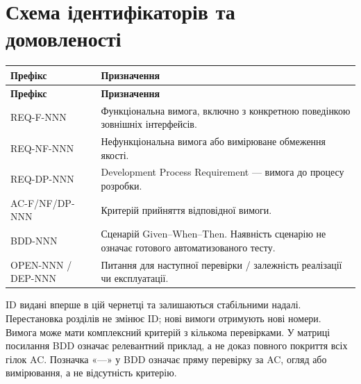 \documentclass[11pt,a4paper]{article}
\begin{document}
\section{Схема ідентифікаторів та домовленості}
\begin{longtable}{>{\raggedright\arraybackslash}p{4.4cm} >{\raggedright\arraybackslash}p{11.2cm}}
\toprule
\textbf{Префікс} & \textbf{Призначення} \\ \midrule
\endfirsthead
\toprule
\textbf{Префікс} & \textbf{Призначення} \\ \midrule
\endhead
\bottomrule
\endfoot
REQ-F-NNN & Функціональна вимога, включно з конкретною поведінкою зовнішніх інтерфейсів. \\
REQ-NF-NNN & Нефункціональна вимога або вимірюване обмеження якості. \\
REQ-DP-NNN & Development Process Requirement — вимога до процесу розробки. \\
AC-F/NF/DP-NNN & Критерій прийняття відповідної вимоги. \\
BDD-NNN & Сценарій Given–When–Then. Наявність сценарію не означає готового автоматизованого тесту. \\
OPEN-NNN / DEP-NNN & Питання для наступної перевірки / залежність реалізації чи експлуатації. \\
\end{longtable}

ID видані вперше в цій чернетці та залишаються стабільними надалі. Перестановка розділів не змінює ID; нові вимоги отримують нові номери. Вимога може мати комплексний критерій з кількома перевірками. У матриці посилання BDD означає релевантний приклад, а не доказ повного покриття всіх гілок AC. Позначка «—» у BDD означає пряму перевірку за AC, огляд або вимірювання, а не відсутність критерію.
\end{document}
